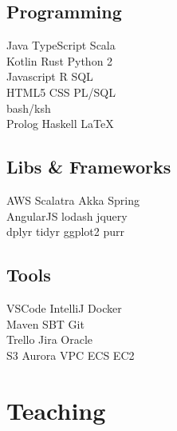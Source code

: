 \documentclass[letterpaper]{deedy-resume} %
\begin{document}
\begin{minipage}[t]{0.33\textwidth}
\sectionspace %

\subsection{Programming}

Java \textbullet{} TypeScript \textbullet{} Scala \\
Kotlin \textbullet{} Rust \textbullet{} Python 2 \\
Javascript \textbullet{} R \textbullet{} SQL \\ 
HTML5 \textbullet{} CSS \textbullet{} PL/SQL \\
bash/ksh \\ 
Prolog \textbullet{} Haskell \textbullet{} \LaTeX\

\sectionspace %

\subsection{Libs \& Frameworks}

AWS \textbullet{} Scalatra \textbullet{} Akka \textbullet{} Spring \\
AngularJS \textbullet{} lodash \textbullet{} jquery \\
dplyr \textbullet{} tidyr \textbullet{} ggplot2 \textbullet{} purr

\sectionspace %

\subsection{Tools}

VSCode \textbullet{} IntelliJ \textbullet{} Docker \\
Maven \textbullet{} SBT \textbullet{} Git \\
Trello \textbullet{} Jira \textbullet{} Oracle \\
S3 \textbullet{} Aurora \textbullet{} VPC \textbullet{} ECS \textbullet{} EC2

\sectionspace %


\section{Teaching}


\end{minipage}
\end{document}
